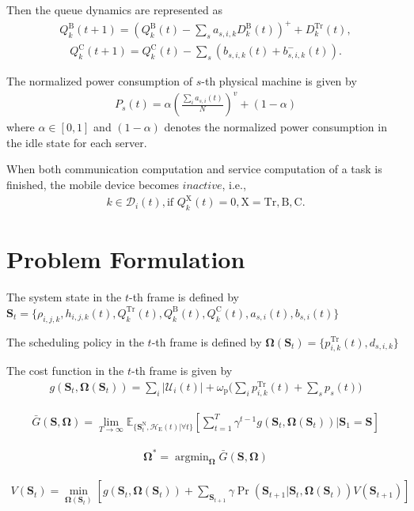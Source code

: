 \documentclass[journal, 12pt, onecolumn, draftclsnofoot]{IEEEtran}
\begin{document}
Then the queue dynamics are represented as
\begin{align}
	Q_{k}^{\mathrm{B}}(t+1)=(Q_{k}^{\mathrm{B}}(t)-\sum_{s}a_{s,i,k}D_{k}^{\mathrm{B}}(t))^{+}+D_{k}^{\mathrm{Tr}}(t),
\end{align}
\begin{align}
	Q_{k}^{\mathrm{C}}(t+1)=Q_{k}^{\mathrm{C}}(t)-\sum_{s}(b_{s,i,k}(t)+b_{s,i,k}^{-}(t)).
\end{align}

The normalized power consumption of $s$-th physical machine is given by
\begin{align}
	P_{s}(t)= \alpha\left(\frac{\sum_{i}a_{s,i}(t)}{N}\right)^{v}+(1-\alpha)
\end{align}
where $\alpha\in[0,1]$ and $(1-\alpha)$ denotes the normalized power consumption in the idle state for each server.

When both communication computation and service computation of a task is finished, the mobile device becomes $\textit{inactive}$, i.e.,
\begin{align}
	k\in\mathcal{D}_{i}(t),\text{if }Q_{k}^{\mathrm{X}}(t)=0,\mathrm{X}=\mathrm{Tr},\mathrm{B},\mathrm{C}.
\end{align}

\section{Problem Formulation}
The system state in the $t$-th frame is defined by \\
$\mathbf{S}_{t}=\{\rho_{i,j,k},h_{i,j,k}(t),Q_{k}^{\mathrm{Tr}}(t),Q_{k}^{\mathrm{B}}(t),Q_{k}^{\mathrm{C}}(t),a_{s,i}(t),b_{s,i}(t)\}$

The scheduling policy in the $t$-th frame is defined by $\mathbf{\Omega}(\mathbf{S}_{t})=\{p_{i,k}^{\mathrm{Tr}}(t),d_{s,i,k}\}$

The cost function in the $t$-th frame is given by
\begin{align}
	g(\mathbf{S}_{t},\mathbf{\Omega}(\mathbf{S}_{t}))=\sum_{i}|\mathcal{U}_{i}(t)|+\omega_{\mathrm{p}}\bigg(\sum_{i}p_{i,k}^{\mathrm{Tr}}(t)+\sum_{s}p_{s}(t)\bigg)
\end{align}

\begin{align}
	\bar{G}(\mathbf{S},\mathbf{\Omega})=\lim_{T\to\infty}\mathbb{E}_{\{\mathbf{S}_{t}^{\mathrm{N}},\mathcal{H}_{\mathrm{E}}(t)|\forall t\}}\left[\sum_{t=1}^{T}\gamma^{t-1}g(\mathbf{S}_{t},\mathbf{\Omega}(\mathbf{S}_{t}))|\mathbf{S}_{1}=\mathbf{S}\right]
\end{align}

\begin{align}
	\mathbf{\Omega}^{*}=\mathop{\arg\min}_{\mathbf{\Omega}}\bar{G}(\mathbf{S},\mathbf{\Omega})
\end{align}

\begin{align}
	V(\mathbf{S}_{t})=\min_{\mathbf{\Omega}(\mathbf{S}_{t})}\left[g(\mathbf{S}_{t},\mathbf{\Omega}(\mathbf{S}_{t}))+\sum_{\mathbf{S}_{t+1}}\gamma\Pr(\mathbf{S}_{t+1}|\mathbf{S}_{t},\mathbf{\Omega}(\mathbf{S}_{t}))V(\mathbf{S}_{t+1})\right]
\end{align}


\appendices


\end{document}
